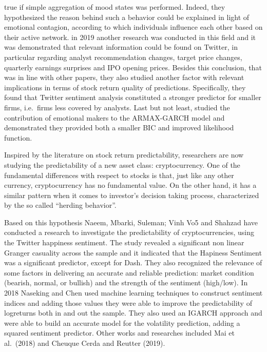 \documentclass[
]{article}
\begin{document}
true if simple aggregation of mood states was performed. Indeed, they
hypothesized the reason behind such a behavior could be explained in
light of emotional contagion, according to which individuals influence
each other based on their active network. in
2019\autocite{guInformationalRoleSocial2020a} another research was
conducted in this field and it was demonstrated that relevant
information could be found on Twitter, in particular regarding analyst
recommendation changes, target price changes, quarterly earnings
surprises and IPO opening prices. Besides this conclusion, that was in
line with other papers, they also studied another factor with relevant
implications in terms of stock return quality of predictions.
Specifically, they found that Twitter sentiment analysis constituted a
stronger predictor for smaller firms, i.e.~firms less covered by
analysts. Last but not
least,\textcite{porshnevCouldEmotionalMarkers2016} studied the
contribution of emotional makers to the ARMAX-GARCH model and
demonstrated they provided both a smaller BIC and improved likelihood
function.

Inspired by the literature on stock return predictability, researchers
are now studying the predictability of a new asset class:
cryptocurrency. One of the fundamental differences with respect to
stocks is that, just like any other currency, cryptocurrency has no
fundamental value. On the other hand, it has a similar pattern when it
comes to investor's decision taking process, characterized by the so
called ``herding behavior''.
\autocite{ballisTestingHerdingCryptocurrency2020,dagamasilvaHerdingBehaviorContagion2019,poyserHerdingBehaviorCryptocurrency2018}

Based on this hypothesis Naeem, Mbarki, Suleman; Vinh Vo5 and Shahzad
\autocite{naeemDoesTwitterHappiness2021} have conducted a research to
investigate the predictability of cryptocurrencies, using the Twitter
happiness sentiment. The study revealed a significant non linear Granger
casuality across the sample and it indicated that the Hapiness Sentiment
was a significant predictor, except for Dash. They also recognized the
relevance of some factors in delivering an accurate and reliable
prediction: market condition (bearish, normal, or bullish) and the
strength of the sentiment (high/low). In 2018 Naseking and Chen
\autocite{nasekinDeepLearningbasedCryptocurrency2020}used machine
learning techniques to construct sentiment indices and adding those
values they were able to improve the predictability of logreturns both
in and out the sample. They also used an IGARCH approach and were able
to build an accurate model for the volatility prediction, adding a
squared sentiment predictor. Other works and researches included Mai et
al.~(2018) and Cheuque Cerda and Reutter (2019).
\end{document}
